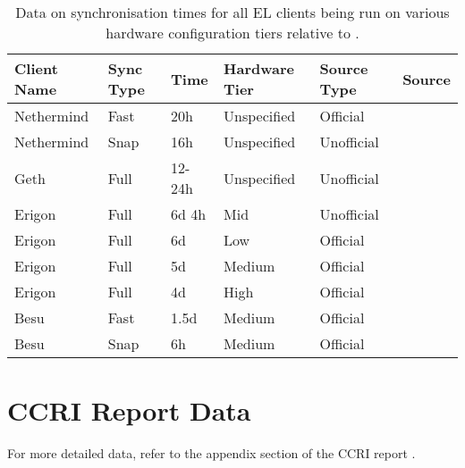 \begin{table}[htb!]
\centering
\begin{tabular}{|l|l|l|l|l|l|}
\hline
\textbf{Client Name} & \textbf{Sync Type} & \textbf{Time} & \textbf{Hardware Tier} & \textbf{Source Type} & \textbf{Source} \\ \hline
Nethermind & Fast & 20h    & Unspecified & Official   & \cite{2022SyncDocs} \\ \hline
Nethermind & Snap & 16h    & Unspecified & Unofficial & \cite{3Ethstakerc} \\ \hline
Geth       & Full & 12-24h & Unspecified & Unofficial & \cite{3Ethstakerb} \\ \hline
Erigon     & Full & 6d 4h  & Mid         & Unofficial & \cite{3Ethstaker}  \\ \hline
Erigon     & Full & 6d     & Low         & Official   & \cite{2022Ledgerwatch/erigon:Frontier}  \\ \hline
Erigon     & Full & 5d     & Medium      & Official   & \cite{2022Ledgerwatch/erigon:Frontier}  \\ \hline
Erigon     & Full & 4d     & High        & Official   &\cite{2022Ledgerwatch/erigon:Frontier} \\ \hline
Besu       & Fast & 1.5d   & Medium      & Official   & \cite{SyncBesu} \\ \hline
Besu       & Snap & 6h     & Medium      & Official   & \cite{SyncBesu} \\ \hline
\end{tabular}
\caption{Data on synchronisation times for all EL clients being run on various hardware configuration tiers relative to  .}
\label{Table:ELRunTime}
\end{table}







\section{CCRI Report Data}



For more detailed data, refer to the appendix section of the CCRI report \cite{CryptoCarbonRatingsInstitute2022TheNetwork}.


